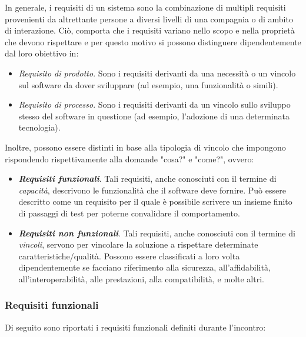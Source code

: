 In generale, i requisiti di un sistema sono la combinazione di multipli requisiti provenienti da altrettante persone a diversi livelli di una compagnia o di ambito di interazione. Ciò, comporta che i requisiti variano nello scopo e nella proprietà che devono rispettare e per questo motivo si possono distinguere dipendentemente dal loro obiettivo in:\cite{requirements_types}

\begin{itemize}
    \item \textit{Requisito di prodotto}. Sono i requisiti derivanti da una necessità o un vincolo sul software da dover sviluppare (ad esempio, una funzionalità o simili).
    \item \textit{Requisito di processo}. Sono i requisiti derivanti da un vincolo sullo sviluppo stesso del software in questione (ad esempio, l'adozione di una determinata tecnologia).
\end{itemize}

Inoltre, possono essere distinti in base alla tipologia di vincolo che impongono rispondendo rispettivamente alla domande "cosa?" e "come?", ovvero:

\begin{itemize}
    \item \textit{\textbf{Requisiti funzionali}}. Tali requisiti, anche conosciuti con il termine di \textit{capacità}, descrivono le funzionalità che il software deve fornire. Può essere descritto come un requisito per il quale è possibile scrivere un insieme finito di passaggi di test per poterne convalidare il comportamento.
    \item \textit{\textbf{Requisiti non funzionali}}. Tali requisiti, anche conosciuti con il termine di \textit{vincoli}, servono per vincolare la soluzione a rispettare determinate caratteristiche/qualità. Possono essere classificati a loro volta dipendentemente se facciano riferimento alla sicurezza, all'affidabilità, all'interoperabilità, alle prestazioni, alla compatibilità, e molte altri.
\end{itemize}


\subsubsection{Requisiti funzionali}

Di seguito sono riportati i requisiti funzionali definiti durante l'incontro:

